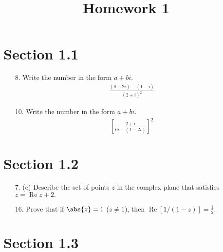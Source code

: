 \documentclass{article}
\DeclareMathOperator{\re}{Re}
\begin{document}
\title{Homework 1}
\maketitle
\thispagestyle{fancy}

\section*{Section 1.1}

\begin{itemize}
	\item[8.] Write the number in the form $a+bi.$
		\begin{align*}
			\frac{(8+2i)-(1-i)}{(2+i)^2}
		\end{align*}

	\item[10.] Write the number in the form $a+bi.$
		\begin{align*}
			\left[ \frac{2+i}{6i-(1-2i)} \right]^2
		\end{align*}

\end{itemize}

\section*{Section 1.2}

\begin{itemize}
	\item[7.] (e) Describe the set of points $z$ in the complex plane that satisfies $z=\re z+2.$

	\item[16.] Prove that if $\abs{z}=1$ ($z\neq 1$), then $\re[1/(1-z)]=\frac{1}{2}.$
		
\end{itemize}

\section*{Section 1.3}
\end{document}
